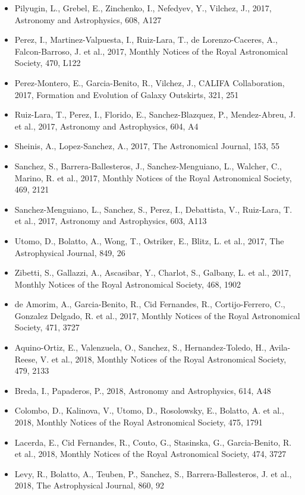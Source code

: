 \documentclass{letter}
\begin{document}
\begin{enumerate}
\begin{itemize}
\item Pilyugin, L., Grebel, E., Zinchenko, I., Nefedyev, Y., Vilchez, J., 2017, Astronomy and Astrophysics, 608, A127
\item Perez, I., Martinez-Valpuesta, I., Ruiz-Lara, T., de Lorenzo-Caceres, A., Falcon-Barroso, J. et al., 2017, Monthly Notices of the Royal Astronomical Society, 470, L122
\item Perez-Montero, E., Garcia-Benito, R., Vilchez, J., CALIFA Collaboration, 2017, Formation and Evolution of Galaxy Outskirts, 321, 251
\item Ruiz-Lara, T., Perez, I., Florido, E., Sanchez-Blazquez, P., Mendez-Abreu, J. et al., 2017, Astronomy and Astrophysics, 604, A4
\item Sheinis, A., Lopez-Sanchez, A., 2017, The Astronomical Journal, 153, 55
\item Sanchez, S., Barrera-Ballesteros, J., Sanchez-Menguiano, L., Walcher, C., Marino, R. et al., 2017, Monthly Notices of the Royal Astronomical Society, 469, 2121
\item Sanchez-Menguiano, L., Sanchez, S., Perez, I., Debattista, V., Ruiz-Lara, T. et al., 2017, Astronomy and Astrophysics, 603, A113
\item Utomo, D., Bolatto, A., Wong, T., Ostriker, E., Blitz, L. et al., 2017, The Astrophysical Journal, 849, 26
\item Zibetti, S., Gallazzi, A., Ascasibar, Y., Charlot, S., Galbany, L. et al., 2017, Monthly Notices of the Royal Astronomical Society, 468, 1902
\item de Amorim, A., Garcia-Benito, R., Cid Fernandes, R., Cortijo-Ferrero, C., Gonzalez Delgado, R. et al., 2017, Monthly Notices of the Royal Astronomical Society, 471, 3727
\item Aquino-Ortiz, E., Valenzuela, O., Sanchez, S., Hernandez-Toledo, H., Avila-Reese, V. et al., 2018, Monthly Notices of the Royal Astronomical Society, 479, 2133
\item Breda, I., Papaderos, P., 2018, Astronomy and Astrophysics, 614, A48
\item Colombo, D., Kalinova, V., Utomo, D., Rosolowsky, E., Bolatto, A. et al., 2018, Monthly Notices of the Royal Astronomical Society, 475, 1791
\item Lacerda, E., Cid Fernandes, R., Couto, G., Stasinska, G., Garcia-Benito, R. et al., 2018, Monthly Notices of the Royal Astronomical Society, 474, 3727
\item Levy, R., Bolatto, A., Teuben, P., Sanchez, S., Barrera-Ballesteros, J. et al., 2018, The Astrophysical Journal, 860, 92

\end{itemize}
\end{enumerate}
\end{document}
